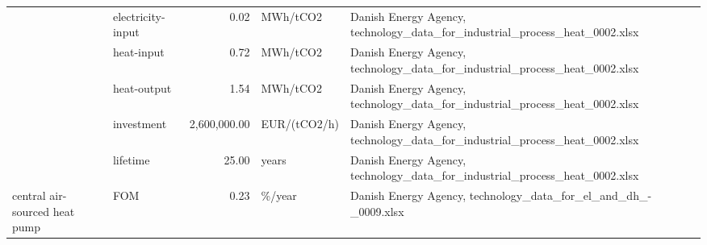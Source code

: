 \begin{longtable}{p{5cm}p{3cm}rp{3cm}p{11cm}}
                      & electricity-input &           0.02 &                          MWh/tCO2 &                                                                                                                                                                                                                                                          Danish Energy Agency, technology\_data\_for\_industrial\_process\_heat\_0002.xlsx \\
                      & heat-input &           0.72 &                          MWh/tCO2 &                                                                                                                                                                                                                                                          Danish Energy Agency, technology\_data\_for\_industrial\_process\_heat\_0002.xlsx \\
                      & heat-output &           1.54 &                          MWh/tCO2 &                                                                                                                                                                                                                                                          Danish Energy Agency, technology\_data\_for\_industrial\_process\_heat\_0002.xlsx \\
                      & investment &   2,600,000.00 &                      EUR/(tCO2/h) &                                                                                                                                                                                                                                                          Danish Energy Agency, technology\_data\_for\_industrial\_process\_heat\_0002.xlsx \\
                      & lifetime &          25.00 &                             years &                                                                                                                                                                                                                                                          Danish Energy Agency, technology\_data\_for\_industrial\_process\_heat\_0002.xlsx \\
central air-sourced heat pump & FOM &           0.23 &                            \%/year &                                                                                                                                                                                                                                                                      Danish Energy Agency, technology\_data\_for\_el\_and\_dh\_-\_0009.xlsx \\

\end{longtable}
